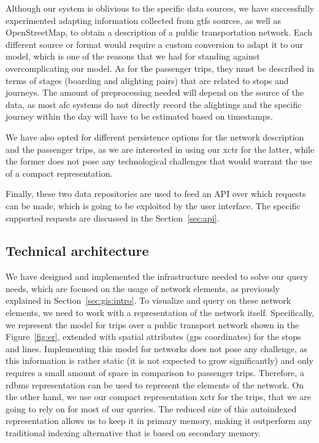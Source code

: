 	Although our system is oblivious to the specific data sources, we have successfully experimented adapting information collected from \gls{gtfs} sources, as well as OpenStreetMap, to obtain a description of a public transportation network. Each different source or format would require a custom conversion to adapt it to our model, which is one of the reasons that we had for standing against overcomplicating our model. As for the passenger trips, they must be described in terms of stages (boarding and alighting pairs) that are related to stops and journeys. The amount of preprocessing needed will depend on the source of the data, as most \gls{afc} systems do not directly record the alightings and the specific journey within the day will have to be estimated based on timestamps.
	
	We have also opted for different persistence options for the network description and the passenger trips, as we are interested in using our \gls{xctr} for the latter, while the former does not pose any technological challenges that would warrant the use of a compact representation.
	
	Finally, these two data repositories are used to feed an API over which requests can be made, which is going to be exploited by the user interface. The specific supported requests are discussed in the Section~\ref{sec:api}.
	
	\subsection{Technical architecture}
	We have designed and implemented the infrastructure needed to solve our query needs, which are focused on the usage of network elements, as previously explained in Section~\ref{sec:gis:intro}. 
	To visualize and query on these network elements, we need to work with a representation of the network itself. Specifically, we represent the model for trips over a public transport network shown in the Figure~\ref{fig:er}, extended with spatial attributes (gps coordinates) for the stops and lines. Implementing this model for networks does not pose any challenge, as this information is rather static (it is not expected to grow significantly) and only requires a small amount of space in comparison to passenger trips. Therefore, a \gls{rdbms} representation can be used  to represent the elements of the network. On the other hand, we use our compact representation \gls{xctr} for the trips, that we are going to rely on for most of our queries. The reduced size of this autoindexed representation allows us to keep it in primary memory, making it outperform any traditional indexing alternative that is based on secondary memory.

